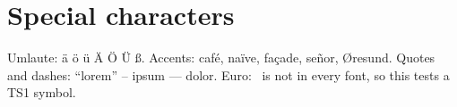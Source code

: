 \documentclass[11pt,a4paper]{article}
\begin{document}
\section{Special characters}\label{sec:unicode}
Umlaute: ä ö ü Ä Ö Ü ß. Accents: café, naïve, façade, señor, Øresund.
Quotes and dashes: ``lorem'' -- ipsum --- dolor. Euro: \texteuro\ is not in
every font, so this tests a TS1 symbol.



\end{document}
